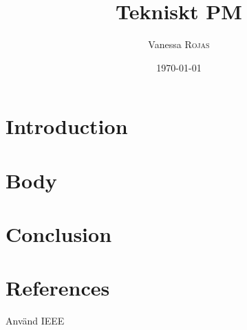 \documentclass{article}
\title{Tekniskt PM}
\author{Vanessa \textsc{Rojas}}
\date{\today}
\begin{document}
\section{Introduction}
\section{Body}
\section{Conclusion}
\section{References}
Använd IEEE
\maketitle
\end{document}
